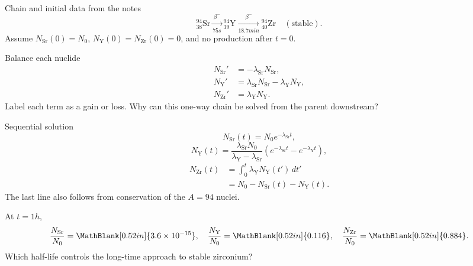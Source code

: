 \newpage
\begin{handoutcolumns}


\begin{fixedbox}{Chain and initial data from the notes}
\[
{}^{94}_{38}\mathrm{Sr}
 \xrightarrow[75\unit{s}]{\beta^-}
{}^{94}_{39}\mathrm{Y}
 \xrightarrow[18.7\unit{min}]{\beta^-}
{}^{94}_{40}\mathrm{Zr}\quad(\text{stable}).
\]
Assume $N_{\mathrm{Sr}}(0)=N_0$,
$N_{\mathrm{Y}}(0)=N_{\mathrm{Zr}}(0)=0$, and no production after $t=0$.
\end{fixedbox}

\begin{boardbox}{Balance each nuclide}
\begin{align*}
 N_{\mathrm{Sr}}'&=-\lambda_{\mathrm{Sr}}N_{\mathrm{Sr}},\\
 N_{\mathrm{Y}}'&=\lambda_{\mathrm{Sr}}N_{\mathrm{Sr}}
                  -\lambda_{\mathrm{Y}}N_{\mathrm{Y}},\\
 N_{\mathrm{Zr}}'&=\lambda_{\mathrm{Y}}N_{\mathrm{Y}}.
\end{align*}
Label each term as a gain or loss.  Why can this one-way chain be solved from
the parent downstream?
\end{boardbox}

\begin{fixedbox}{Sequential solution}
\[
 N_{\mathrm{Sr}}(t)=N_0e^{-\lambda_{\mathrm{Sr}}t},
\]
\[
 N_{\mathrm{Y}}(t)
 =\frac{\lambda_{\mathrm{Sr}}N_0}
 {\lambda_{\mathrm{Y}}-\lambda_{\mathrm{Sr}}}
 \left(e^{-\lambda_{\mathrm{Sr}}t}-e^{-\lambda_{\mathrm{Y}}t}\right),
\]
\[
 \begin{aligned}
 N_{\mathrm{Zr}}(t)
 &=\int_0^t\lambda_{\mathrm{Y}}N_{\mathrm{Y}}(t')\,dt'\\[-1pt]
 &=N_0-N_{\mathrm{Sr}}(t)-N_{\mathrm{Y}}(t).
 \end{aligned}
\]
The last line also follows from conservation of the $A=94$ nuclei.
\end{fixedbox}

\begin{checkpoint}
At $t=1\unit{h}$,
\[
 \frac{N_{\mathrm{Sr}}}{N_0}=\MathBlank[0.52in]{3.6\times10^{-15}},\quad
 \frac{N_{\mathrm{Y}}}{N_0}=\MathBlank[0.52in]{0.116},\quad
 \frac{N_{\mathrm{Zr}}}{N_0}=\MathBlank[0.52in]{0.884}.
\]
Which half-life controls the long-time approach to stable zirconium?
\end{checkpoint}


\end{handoutcolumns}
